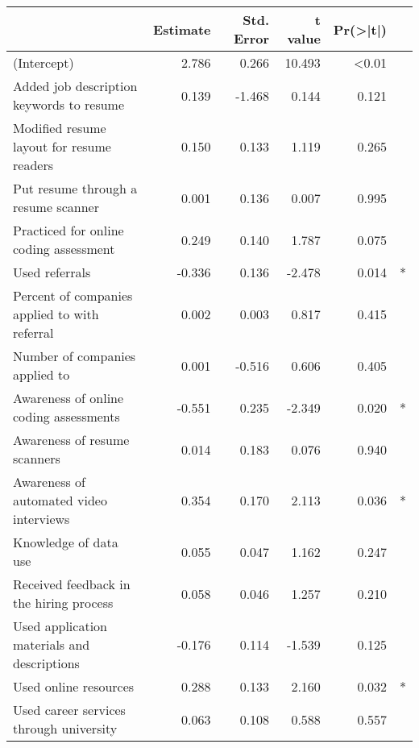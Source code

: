 \begin{table}[ht]
\begin{tabular}{lrrrrl}
\hline
\textbf{}                                            & \textbf{Estimate} & \textbf{Std. Error} & \textbf{t value} & \textbf{Pr(\textgreater{}|t|)} & \textbf{} \\ \hline
(Intercept)                                       & 2.786  & 0.266 & 10.493 & \textless{}0.01 &   \\
Added job description keywords to resume & 0.139  & -1.468    & 0.144 & 0.121            &   \\
Modified resume layout for resume readers & 0.150         & 0.133           & 1.119            & 0.265                         &           \\
Put resume through a resume scanner               & 0.001  & 0.136 & 0.007  & 0.995           &   \\
Practiced for online coding assessment            & 0.249  & 0.140 & 1.787  & 0.075           &   \\
Used referrals                                    & -0.336 & 0.136 & -2.478 & 0.014           & * \\
Percent of companies applied to with referral   & 0.002         & 0.003           & 0.817            & 0.415                         &           \\
Number of companies applied to                    & 0.001  & -0.516    & 0.606 & 0.405            &   \\
Awareness of online coding assessments            & -0.551 & 0.235 & -2.349 & 0.020           & * \\
Awareness of resume scanners                      & 0.014  & 0.183 & 0.076  & 0.940           &   \\
Awareness of automated video interviews           & 0.354  & 0.170 & 2.113  & 0.036           & * \\
Knowledge of data use                             & 0.055  & 0.047 & 1.162  & 0.247           &   \\
Received feedback in the hiring process           & 0.058  & 0.046 & 1.257  & 0.210           &   \\
Used application materials and descriptions       & -0.176 & 0.114 & -1.539 & 0.125           &   \\
Used online resources                             & 0.288  & 0.133 & 2.160  & 0.032           & * \\
Used career services through university           & 0.063  & 0.108 & 0.588  & 0.557           &   \\

\end{tabular}
\end{table}
